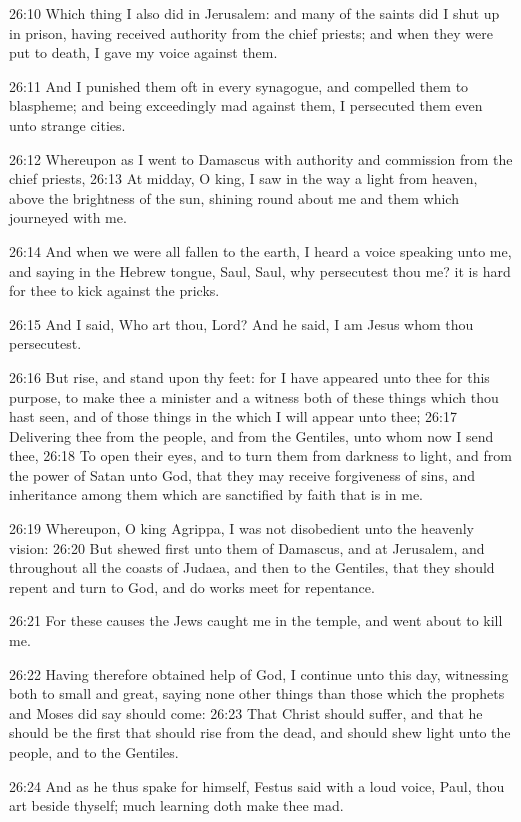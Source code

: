 26:10 Which thing I also did in Jerusalem: and many of the saints did I shut up in prison, having received authority from the chief priests; and when they were put to death, I gave my voice against them.

26:11 And I punished them oft in every synagogue, and compelled them to blaspheme; and being exceedingly mad against them, I persecuted them even unto strange cities.

26:12 Whereupon as I went to Damascus with authority and commission from the chief priests, 26:13 At midday, O king, I saw in the way a light from heaven, above the brightness of the sun, shining round about me and them which journeyed with me.

26:14 And when we were all fallen to the earth, I heard a voice speaking unto me, and saying in the Hebrew tongue, Saul, Saul, why persecutest thou me? it is hard for thee to kick against the pricks.

26:15 And I said, Who art thou, Lord? And he said, I am Jesus whom thou persecutest.

26:16 But rise, and stand upon thy feet: for I have appeared unto thee for this purpose, to make thee a minister and a witness both of these things which thou hast seen, and of those things in the which I will appear unto thee; 26:17 Delivering thee from the people, and from the Gentiles, unto whom now I send thee, 26:18 To open their eyes, and to turn them from darkness to light, and from the power of Satan unto God, that they may receive forgiveness of sins, and inheritance among them which are sanctified by faith that is in me.

26:19 Whereupon, O king Agrippa, I was not disobedient unto the heavenly vision: 26:20 But shewed first unto them of Damascus, and at Jerusalem, and throughout all the coasts of Judaea, and then to the Gentiles, that they should repent and turn to God, and do works meet for repentance.

26:21 For these causes the Jews caught me in the temple, and went about to kill me.

26:22 Having therefore obtained help of God, I continue unto this day, witnessing both to small and great, saying none other things than those which the prophets and Moses did say should come: 26:23 That Christ should suffer, and that he should be the first that should rise from the dead, and should shew light unto the people, and to the Gentiles.

26:24 And as he thus spake for himself, Festus said with a loud voice, Paul, thou art beside thyself; much learning doth make thee mad.

